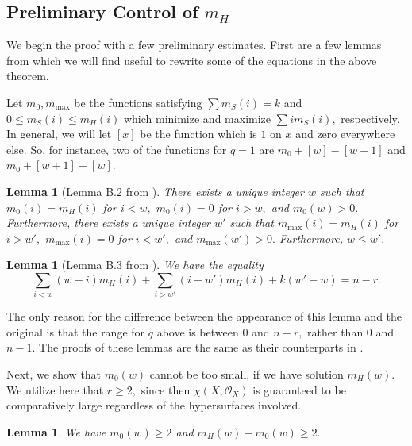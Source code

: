 \documentclass{article}
\newtheorem{lemma}[thm]{Lemma}
\theoremstyle{definition}
\theoremstyle{remark}
\begin{document}
\subsection{Preliminary Control of $m_H$}
We begin the proof with a few preliminary estimates. First are a few lemmas from \cite{ls25} which we will find useful to rewrite some of the equations in the above theorem.
\par Let $m_0, m_{\text{max}}$ be the functions satisfying $\sum m_S(i) = k$ and $0 \leq m_S(i) \leq m_H(i)$ which minimize and maximize $\sum im_S(i),$ respectively. In general, we will let $[x]$ be the function which is $1$ on $x$ and zero everywhere else. So, for instance, two of the functions for $q = 1$ are $m_0 + [w] - [w-1]$ and $m_0 + [w+1] - [w].$
\begin{lemma}[Lemma B.2 from \cite{ls25}]\label{lem: w and w' cutoffs}
There exists a unique integer $w$ such that $m_0(i) = m_H(i)$ for $i < w,$ $m_0(i) = 0$ for $i > w,$ and $m_0(w) > 0.$ Furthermore, there exists a unique integer $w'$ such that $m_{\text{max}}(i) = m_H(i)$ for $i > w',$ $m_{\text{max}}(i) = 0$ for $i < w',$ and $m_{\text{max}}(w') > 0.$ Furthermore, $w \leq w'.$
\end{lemma}
\begin{lemma}[Lemma B.3 from \cite{ls25}]\label{lem: basic summation for mH}
We have the equality \[\sum\limits_{i < w} (w-i) m_H(i) + \sum\limits_{i > w'} (i-w')m_H(i) + k(w' - w) = n - r.\]
\end{lemma}
The only reason for the difference between the appearance of this lemma and the original is that the range for $q$ above is between $0$ and $n-r,$ rather than $0$ and $n-1.$ The proofs of these lemmas are the same as their counterparts in \cite{ls25}.
\par Next, we show that $m_0(w)$ cannot be too small, if we have solution $m_H(w).$ We utilize here that $r \geq 2,$ since then $\chi(X, \mathcal{O}_X)$ is guaranteed to be comparatively large regardless of the hypersurfaces involved. 
\begin{lemma}\label{lem: m0 not 1.}
We have $m_0(w) \geq 2$ and $m_H(w) - m_0(w) \geq 2.$
\end{lemma}
\end{document}
